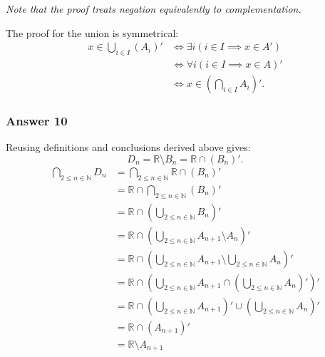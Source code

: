 \documentclass[11pt]{article}
\begin{document}
\emph{Note that the proof treats negation equivalently to complementation.}

The proof for the union is symmetrical:
\begin{equation*}
  \begin{aligned}
    x \in \bigcup_{i \in I} (A_i)'
    &\iff \exists i (i \in I \implies x \in A') \\
    &\iff \forall i (i \in I \implies x \in A)' \\
    &\iff x \in (\bigcap_{i \in I} A_i)'.
  \end{aligned}
\end{equation*}
\subsubsection{Answer 10}
\label{sec-1-4-5}
Reusing definitions and conclusions derived above gives:
\begin{equation*}
  D_n = \mathbb{R} \setminus B_n = \mathbb{R} \cap (B_n)'.
\end{equation*}
\begin{equation*}
  \begin{aligned}
    \bigcap_{2 \leq n \in \mathbb{N}} D_n
    &= \bigcap_{2 \leq n \in \mathbb{N}} \mathbb{R} \cap (B_n)' \\
    &= \mathbb{R} \cap \bigcap_{2 \leq n \in \mathbb{N}} (B_n)' \\
    &= \mathbb{R} \cap (\bigcup_{2 \leq n \in \mathbb{N}} B_n)' \\
    &= \mathbb{R} \cap (\bigcup_{2 \leq n \in \mathbb{N}} A_{n+1} \setminus A_n)' \\
    &= \mathbb{R} \cap (\bigcup_{2 \leq n \in \mathbb{N}} A_{n+1}
    \setminus \bigcup_{2 \leq n \in \mathbb{N}} A_n)' \\
    &= \mathbb{R} \cap (\bigcup_{2 \leq n \in \mathbb{N}} A_{n+1}
    \cap (\bigcup_{2 \leq n \in \mathbb{N}} A_n)')' \\
    &= \mathbb{R} \cap (\bigcup_{2 \leq n \in \mathbb{N}} A_{n+1})'
    \cup (\bigcup_{2 \leq n \in \mathbb{N}} A_n)' \\
    &= \mathbb{R} \cap (A_{n+1})' \\
    &= \mathbb{R} \setminus A_{n+1}
  \end{aligned}
\end{equation*}
\end{document}
